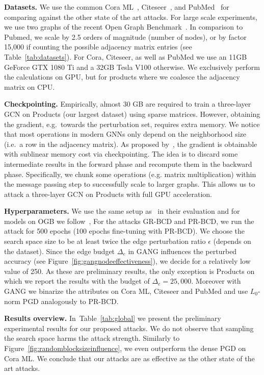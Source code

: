 \documentclass[letterpaper]{article} %
\begin{document}
\textbf{Datasets.} We use the common Cora ML~\citep{Bojchevski2018}, Citeseer~\citep{McCallum2000}, and PubMed~\citep{Sen2008} for comparing against the other state of the art attacks. For large scale experiments, we use two graphs of the recent Open Graph Benchmark~\citep{Hu2020}. In comparison to Pubmed, we scale by 2.5 orders of magnitude (number of nodes), or by factor 15,000 if counting the possible adjacency matrix entries (see Table~\ref{tab:datasets}). For Cora, Citeseer, as well as PubMed we use an 11GB GeForce GTX 1080 Ti and a 32GB Tesla V100 otherwise. We exclusively perform the calculations on GPU, but for products where we coalesce the adjacency matrix on CPU.

\textbf{Checkpointing.} Empirically, almost 30 GB are required to train a three-layer GCN on Products (our largest dataset) using sparse matrices. However, obtaining the gradient, e.g.\ towards the perturbation set, requires extra memory. We notice that most operations in modern GNNs only depend on the neighborhood size (i.e.~a row in the adjacency matrix). As proposed by~\citet{Chen2016}, the gradient is obtainable with sublinear memory cost via checkpointing. The idea is to discard some intermediate results in the forward phase and recompute them in the backward phase. Specifically, we chunk some operations (e.g. matrix multiplication) within the message passing step to successfully scale to larger graphs. This allows us to attack a three-layer GCN on Products with full GPU acceleration.

\textbf{Hyperparameters.} We use the same setup as~\citet{Geisler2020} in their evaluation and for models on OGB we follow~\citet{Hu2020}, For the attacks GR-BCD and PR-BCD, we run the attack for 500 epochs (100 epochs fine-tuning with PR-BCD). We choose the search space size to be at least twice the edge perturbation ratio \(\epsilon\) (depends on the dataset). Since the edge budget \(\Delta_e\) in GANG influences the perturbed accuracy (see Figure~\ref{fig:gangnodeeffectiveness}), we decide for a relatively low value of 250. As these are preliminary results, the only exception is Products on which we report the results with the budget of \(\Delta_e=25,000\). Moreover with GANG we binarize the attributes on Cora ML, Citeseer and PubMed and use \(L_0\)-norm PGD analogously to PR-BCD.

\textbf{Results overview.} In~Table~\ref{tab:global} we present the preliminary experimental results for our proposed attacks. We do not observe that sampling the search space harms the attack strength. Similarly to Figure~\ref{fig:randomblocksizeinfluence}, we even outperform the dense PGD on Cora ML. We conclude that our attacks are as effective as the other state of the art attacks.
\end{document}
